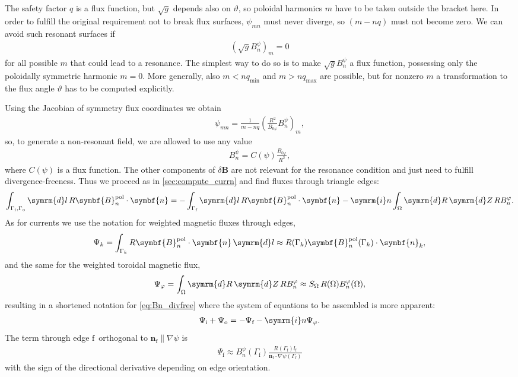 \documentclass[a4paper, 10pt, english]{article}
\let\temp\varrho
\let\varrho\rho
\let\rho\temp
\let\temp\vartheta
\let\vartheta\theta
\let\theta\temp
\let\temp\varphi
\let\varphi\phi
\let\phi\temp
\let\vec\symbf
\newcommand*\diff{\ensuremath{\symrm{d}}}  %
\newcommand*\im{\ensuremath{\symrm{i}}}  %
\newcommand*\pol{\ensuremath{\textrm{pol}}}  %
\newcommand*\fs{\ensuremath{\textrm{f}}}  %
\newcommand*\inw{\ensuremath{\textrm{i}}}  %
\newcommand*\out{\ensuremath{\textrm{o}}}  %
\begin{document}
The safety factor $q$ is a flux function, but $\sqrt{g}$ depends also on $\theta$, so poloidal harmonics $m$ have to be taken outside the bracket here. In order to fulfill the original requirement not to break flux surfaces, $\psi_{m n}$ must never diverge, so $(m - n q)$ must not become zero. We can avoid such resonant surfaces if
\begin{gather*}
  \left( \sqrt{g} B_{n}^{\psi} \right)_{m} = 0
\end{gather*}
for all possible $m$ that could lead to a resonance. The simplest way to do so is to make $\sqrt{g} B_{n}^{\psi}$ a flux function, possessing only the poloidally symmetric harmonic $m = 0$. More generally, also $m < n q_{\text{min}}$ and $m > n q_{\text{max}}$ are possible, but for nonzero $m$ a transformation to the flux angle $\theta$ has to be computed explicitly.

Using the Jacobian of symmetry flux coordinates we obtain
\begin{gather*}
  \psi_{m n} = \frac{1}{m - n q} \left( \frac{R^{2}}{B_{0 \phi}} B_{n}^{\psi} \right)_{m},
\end{gather*}
so, to generate a non-resonant field, we are allowed to use any value
\begin{gather*}
  B_{n}^{\psi} = C(\psi) \frac{B_{0 \phi}}{R^{2}},
\end{gather*}
where $C(\psi)$ is a flux function. The other components of $\delta \vec{B}$ are not relevant for the resonance condition and just need to fulfill divergence-freeness. Thus we proceed as in \cref{sec:compute_currn} and find fluxes through triangle edges:
\begin{gather}
  \int_{\Gamma_{\inw}, \Gamma_{\out}} \diff l \, R \vec{B}_{n}^{\pol} \cdot \vec{n} = -\int_{\Gamma_{\fs}} \diff l \, R \vec{B}_{n}^{\pol} \cdot \vec{n} - \im n \int_{\Omega} \diff R \, \diff Z \, R B_{n}^{\phi}. \label{eq:Bn_divfree}
\end{gather}
As for currents we use the notation for weighted magnetic fluxes through edges,
\begin{gather}
  \Psi_{k} = \int_{\Gamma_{k}} R \vec{B}_{n}^{\pol} \cdot \vec{n} \, \diff l \approx R (\Gamma_{k}) \vec{B}_{n}^{\pol} (\Gamma_{k}) \cdot \vec{n}_{k},
\end{gather}
and the same for the weighted toroidal magnetic flux,
\begin{gather}
  \Psi_{\phi} = \int_{\Omega} \diff R \, \diff Z \, R B_{n}^{\phi} \approx S_{\Omega} \, R (\Omega) B_{n}^{\phi} (\Omega),
\end{gather}
resulting in a shortened notation for \cref{eq:Bn_divfree} where the system of equations to be assembled is more apparent:
\begin{gather}
  \Psi_{\inw} + \Psi_{\out} = -\Psi_{\fs} - \im n \Psi_{\phi}.
\end{gather}
The term through edge \fs\ orthogonal to $\vec{n}_{\fs} \parallel \nabla \psi$ is
\begin{gather}
  \Psi_{\fs} \approx B_{n}^{\psi} (\Gamma_{\fs}) \frac{R (\Gamma_{\fs}) l_{\fs}}{\vec{n}_{\fs} \cdot \nabla \psi (\Gamma_{\fs})} \label{eq:Psi_f}
\end{gather}
with the sign of the directional derivative depending on edge orientation.
\end{document}
